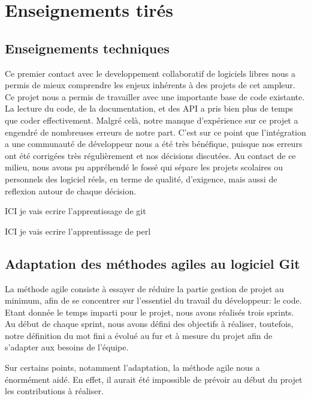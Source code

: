 \documentclass[a4paper, 12pt]{article}
\newenvironment{parremil}{%
  \color{red}
}{%
  \color{white}
}
\begin{document}
\section{Enseignements tirés}

\subsection{Enseignements techniques}

Ce premier contact avec le developpement collaboratif de logiciels libres nous a permis de mieux comprendre les enjeux inhérents à des projets de cet ampleur. 
Ce projet nous a permis de travailler avec une importante base de code existante. La lecture du code, de la documentation, et des API a pris bien plus de temps que coder effectivement. Malgré celà, notre manque d'expérience sur ce projet a engendré de nombreuses erreurs de notre part.
C'est sur ce point que l'intégration a une communauté de développeur nous a été très bénéfique, puisque nos erreurs ont été corrigées très régulièrement et nos décisions discutées.
Au contact de ce milieu, nous avons pu appréhendé le fossé qui sépare les projets scolaires ou personnels des logiciel réels, en terme de qualité, d'exigence, mais aussi de reflexion autour de chaque décision.

\begin{parremil}
ICI je vais ecrire l'apprentissage de git
\end{parremil}

\begin{parremil}
ICI je vais ecrire l'apprentissage de perl
\end{parremil}

\subsection{Adaptation des méthodes agiles au logiciel Git}

La méthode agile consiste à essayer de réduire la partie gestion de projet au minimum, afin de se concentrer sur l'essentiel du travail du développeur: le code.
Etant donnée le temps imparti pour le projet, nous avons réalisés trois sprints.
Au début de chaque sprint, nous avons défini des objectifs à réaliser, toutefois, notre définition du mot fini a évolué au fur et à mesure du projet afin de s'adapter aux besoins de l'équipe.

Sur certains points, notamment l'adaptation, la méthode agile nous a énormément aidé. En effet, il aurait été impossible de prévoir au début du projet les contributions à réaliser.
\end{document}
